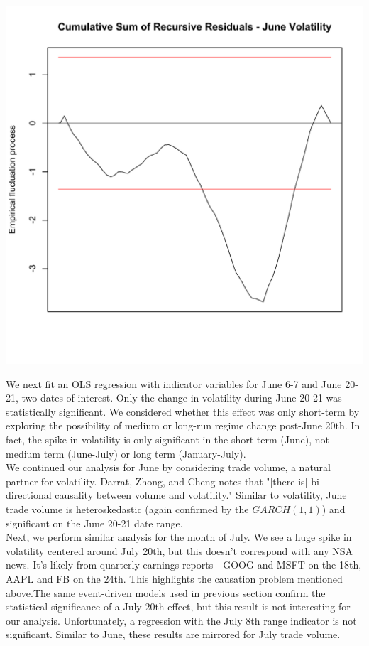 \documentclass[11pt]{amsart}
\begin{document}
\centerline{\includegraphics[scale=0.5]{june_cusum.pdf}}

We next fit an OLS regression with indicator variables for June 6-7 and June 20-21, two dates of interest. Only the change in volatility during June 20-21 was statistically significant. We considered whether this effect was only short-term by exploring the possibility of medium or long-run regime change post-June 20th. In fact, the spike in volatility is only significant in the short term (June), not medium term (June-July) or long term (January-July). \\

We continued our analysis for June by considering trade volume, a natural partner for volatility. Darrat, Zhong, and Cheng notes that "[there is] bi-directional causality between volume and volatility."  Similar to volatility, June trade volume is heteroskedastic (again confirmed by the $GARCH(1,1)$) and significant on the June 20-21 date range. \\

Next, we perform similar analysis for the month of July. We see a huge spike in volatility centered  around July 20th, but this doesn't correspond with any NSA news. It's likely from quarterly earnings reports - GOOG and MSFT on the 18th, AAPL and FB on the 24th. This highlights the causation problem mentioned above.The same event-driven models used in previous section confirm the statistical significance of a July 20th effect, but this result is not interesting for our analysis. Unfortunately, a regression with the July 8th range indicator is not significant. Similar to June, these results are mirrored for July trade volume. \\
\end{document}
